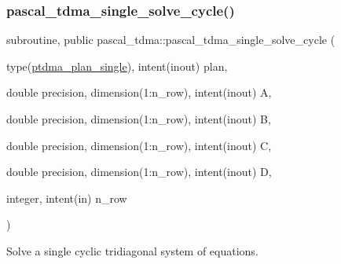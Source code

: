 \subsubsection{\texorpdfstring{pascal\+\_\+tdma\+\_\+single\+\_\+solve\+\_\+cycle()}{pascal\_tdma\_single\_solve\_cycle()}}
{\footnotesize\ttfamily subroutine, public pascal\+\_\+tdma\+::pascal\+\_\+tdma\+\_\+single\+\_\+solve\+\_\+cycle (\begin{DoxyParamCaption}\item[{type(\hyperlink{structpascal__tdma_1_1ptdma__plan__single}{ptdma\+\_\+plan\+\_\+single}), intent(inout)}]{plan,  }\item[{double precision, dimension(1\+:n\+\_\+row), intent(inout)}]{A,  }\item[{double precision, dimension(1\+:n\+\_\+row), intent(inout)}]{B,  }\item[{double precision, dimension(1\+:n\+\_\+row), intent(inout)}]{C,  }\item[{double precision, dimension(1\+:n\+\_\+row), intent(inout)}]{D,  }\item[{integer, intent(in)}]{n\+\_\+row }\end{DoxyParamCaption})}



Solve a single cyclic tridiagonal system of equations. 


